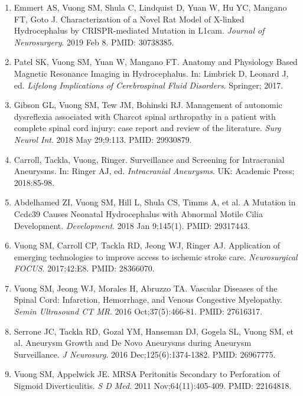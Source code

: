\documentclass[11pt, a4paper]{article}
\begin{document}
\begin{enumerate}
  \item Emmert AS, Vuong SM, Shula C, Lindquist D, Yuan W, Hu YC, Mangano FT, Goto J. Characterization of a Novel Rat Model of X-linked Hydrocephalus by CRISPR-mediated Mutation in L1cam. \textit{Journal of Neurosurgery}. 2019 Feb 8. PMID: 30738385.
  
  \item Patel SK, Vuong SM, Yuan W, Mangano FT. Anatomy and Physiology Based Magnetic Resonance Imaging in Hydrocephalus. In: Limbrick D, Leonard J, ed. \textit{Lifelong Implications of Cerebrospinal Fluid Disorders}. Springer; 2017.
  
  \item Gibson GL, Vuong SM, Tew JM, Bohinski RJ. Management of autonomic dysreflexia associated with Charcot spinal arthropathy in a patient with complete spinal cord injury: case report and review of the literature. \textit{Surg Neurol Int}. 2018 May 29;9:113. PMID: 29930879.
  
  \item Carroll, Tackla, Vuong, Ringer. Surveillance and Screening for Intracranial Aneurysms. In: Ringer AJ, ed. \textit{Intracranial Aneurysms}. UK: Academic Press; 2018:85-98.
  
  \item Abdelhamed ZI, Vuong SM, Hill L, Shula CS, Timms A, et al. A Mutation in Ccdc39 Causes Neonatal Hydrocephalus with Abnormal Motile Cilia Development. \textit{Development}. 2018 Jan 9;145(1). PMID: 29317443.
  
  \item Vuong SM, Carroll CP, Tackla RD, Jeong WJ, Ringer AJ. Application of emerging technologies to improve access to ischemic stroke care. \textit{Neurosurgical FOCUS}. 2017;42:E8. PMID: 28366070.
  
  \item Vuong SM, Jeong WJ, Morales H, Abruzzo TA. Vascular Diseases of the Spinal Cord: Infarction, Hemorrhage, and Venous Congestive Myelopathy. \textit{Semin Ultrasound CT MR}. 2016 Oct;37(5):466-81. PMID: 27616317.
  
  \item Serrone JC, Tackla RD, Gozal YM, Hanseman DJ, Gogela SL, Vuong SM, et al. Aneurysm Growth and De Novo Aneurysms during Aneurysm Surveillance. \textit{J Neurosurg}. 2016 Dec;125(6):1374-1382. PMID: 26967775.
  
  \item Vuong SM, Appelwick JE. MRSA Peritonitis Secondary to Perforation of Sigmoid Diverticulitis. \textit{S D Med}. 2011 Nov;64(11):405-409. PMID: 22164818.
  

\end{enumerate}
\end{document}
